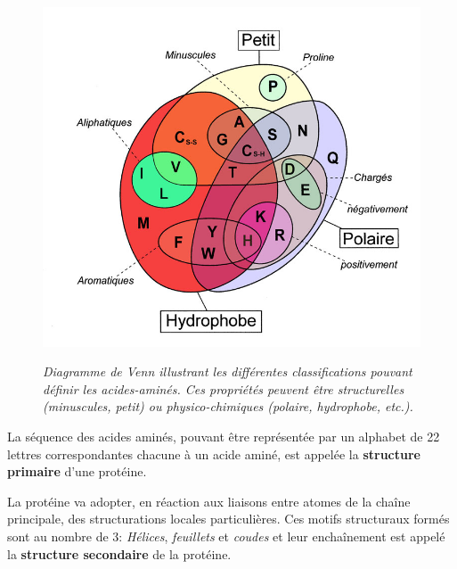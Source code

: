 \begin{figure}
  \centering
  {\includegraphics[width=0.75\linewidth]{./figures/ch1/diagramme_venn}}
    \caption{\it Diagramme de Venn illustrant les différentes classifications pouvant définir les acides-aminés. Ces propriétés peuvent être structurelles (minuscules, petit) ou physico-chimiques (polaire, hydrophobe, etc.).}
    \label{Fig:diagramme_venn}
  \hspace{0.3cm}
\end{figure}




La séquence des acides aminés, pouvant être représentée par un alphabet de 22 lettres correspondantes chacune à un acide aminé, est appelée la \textbf{structure primaire} d'une protéine.

La protéine va adopter, en réaction aux liaisons entre atomes de la chaîne principale, des structurations locales particulières. Ces motifs structuraux formés sont au nombre de 3: \textit{Hélices}, \textit{feuillets} et \textit{coudes} et leur enchaînement est appelé la \textbf{structure secondaire} de la protéine.

